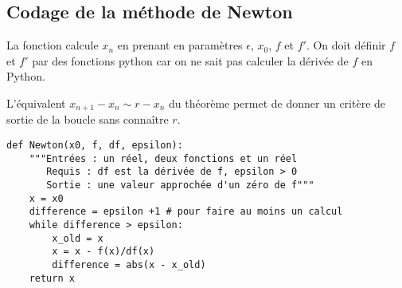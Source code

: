 \subsection{Codage de la méthode de Newton}
La fonction calcule $x_n$ en prenant en paramètres $\epsilon$, $x_0$, $f$ et $f'$. On doit définir $f$ et $f'$ par des fonctions python car on ne sait pas calculer la dérivée de $f$ en Python.

L'équivalent $x_{n+1} - x_n \sim r - x_n$ du théorème permet de donner un critère de sortie de la boucle  sans connaître $r$.
\begin{lstlisting}[caption = {Calcul d'un zéro par la méthode de Newton}]
def Newton(x0, f, df, epsilon): 
    """Entrées : un réel, deux fonctions et un réel
       Requis : df est la dérivée de f, epsilon > 0
       Sortie : une valeur approchée d'un zéro de f"""
    x = x0
    difference = epsilon +1 # pour faire au moins un calcul
    while difference > epsilon:
        x_old = x
        x = x - f(x)/df(x)
        difference = abs(x - x_old)
    return x
\end{lstlisting}

\newpage
